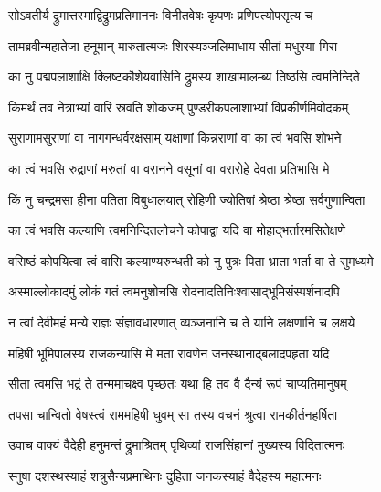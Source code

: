 
\textlink{}
\translink{}

\storymeta


\twolineshloka
{सोऽवतीर्य द्रुमात्तस्माद्विद्रुमप्रतिमाननः}
{विनीतवेषः कृपणः प्रणिपत्योपसृत्य च}

\twolineshloka
{तामब्रवीन्महातेजा हनूमान् मारुतात्मजः}
{शिरस्यञ्जलिमाधाय सीतां मधुरया गिरा}

\twolineshloka
{का नु पद्मपलाशाक्षि क्लिष्टकौशेयवासिनि}
{द्रुमस्य शाखामालम्ब्य तिष्ठसि त्वमनिन्दिते}

\twolineshloka
{किमर्थं तव नेत्राभ्यां वारि स्रवति शोकजम्}
{पुण्डरीकपलाशाभ्यां विप्रकीर्णमिवोदकम्}

\twolineshloka
{सुराणामसुराणां वा नागगन्धर्वरक्षसाम्}
{यक्षाणां किन्नराणां वा का त्वं भवसि शोभने}

\twolineshloka
{का त्वं भवसि रुद्राणां मरुतां वा वरानने}
{वसूनां वा वरारोहे देवता प्रतिभासि मे}

\twolineshloka
{किं नु चन्द्रमसा हीना पतिता विबुधालयात्}
{रोहिणी ज्योतिषां श्रेष्ठा श्रेष्ठा सर्वगुणान्विता}

\twolineshloka
{का त्वं भवसि कल्याणि त्वमनिन्दितलोचने}
{कोपाद्वा यदि वा मोहाद्भर्तारमसितेक्षणे}

\twolineshloka
{वसिष्ठं कोपयित्वा त्वं वासि कल्याण्यरुन्धती}
{को नु पुत्रः पिता भ्राता भर्ता वा ते सुमध्यमे}

\twolineshloka
{अस्माल्लोकादमुं लोकं गतं त्वमनुशोचसि}
{रोदनादतिनिःश्वासाद्भूमिसंस्पर्शनादपि}

\twolineshloka
{न त्वां देवीमहं मन्ये राज्ञः संज्ञावधारणात्}
{व्यञ्जनानि च ते यानि लक्षणानि च लक्षये}

\twolineshloka
{महिषी भूमिपालस्य राजकन्यासि मे मता}
{रावणेन जनस्थानाद्बलादपहृता यदि}

\twolineshloka
{सीता त्वमसि भद्रं ते तन्ममाचक्ष्व पृच्छतः}
{यथा हि तव वै दैन्यं रूपं चाप्यतिमानुषम्}

\twolineshloka
{तपसा चान्वितो वेषस्त्वं राममहिषी धुवम्}
{सा तस्य वचनं श्रुत्वा रामकीर्तनहर्षिता}

\twolineshloka
{उवाच वाक्यं वैदेही हनुमन्तं द्रुमाश्रितम्}
{पृथिव्यां राजसिंहानां मुख्यस्य विदितात्मनः}

\twolineshloka
{स्नुषा दशस्थस्याहं शत्रुसैन्यप्रमाथिनः}
{दुहिता जनकस्याहं वैदेहस्य महात्मनः}

